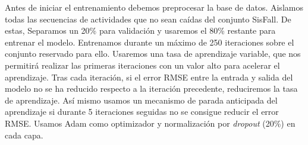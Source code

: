 Antes de iniciar el entrenamiento debemos preprocesar la base de datos. Aislamos todas las secuencias de actividades que no sean caídas del conjunto SisFall. De estas, Separamos un 20\% para validación y usaremos el 80\% restante para entrenar el modelo. Entrenamos durante un máximo de 250 iteraciones sobre el conjunto reservado para ello. Usaremos una tasa de aprendizaje variable, que nos permitirá realizar las primeras iteraciones con un valor alto para acelerar el aprendizaje. Tras cada iteración, si el error RMSE entre la entrada y salida del modelo no se ha reducido respecto a la iteración precedente, reduciremos la tasa de aprendizaje. Así mismo usamos un mecanismo de parada anticipada del aprendizaje si durante 5 iteraciones seguidas no se consigue reducir el error RMSE. Usamos Adam como optimizador y normalización por \textit{dropout} (20\%) en cada capa. 


